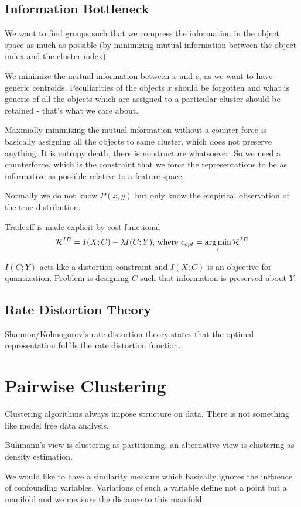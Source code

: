 \documentclass[12pt]{article}
\begin{document}
\subsection{Information Bottleneck}
\par We want to find groups such that we compress the information in the object space as much as possible (by minimizing mutual information between the object index and the cluster index).
\par We minimize the mutual information between $x$ and $c$, as we want to have generic centroids. Peculiarities of the objects $x$ should be forgotten and what is generic of all the objects which are assigned to a particular cluster should be retained - that's what we care about.
\par Maximally minimizing the mutual information without a counter-force is basically assigning all the objects to same cluster, which does not preserve anything. It is entropy death, there is no structure whatsoever. So we need a counterforce, which is the constraint that we force the representations to be as informative as possible relative to a feature space.
\par Normally we do not know $P(x,y)$ but only know the empirical observation of the true distribution.
\par Tradeoff is made explicit by cost functional
\[ \mathcal{R}^{IB} = I(X;C) - \lambda I(C;Y) \text{, where } c_{opt} = \operatorname*{arg\,min}_{c} \mathcal{R}^{IB} \]
\par $I(C;Y)$ acts like a distortion constraint and $I(X;C)$ is an objective for quantization. Problem is designing $C$ such that information is preserved about $Y$.

\subsection{Rate Distortion Theory}
Shannon/Kolmogorov's rate distortion theory states that the optimal representation fulfils the rate distortion function.

\section{Pairwise Clustering}
\par Clustering algorithms always impose structure on data. There is not something like model free data analysis.
\par Buhmann's view is clustering as partitioning, an alternative view is clustering as density estimation.
\par We would like to have a similarity measure which basically ignores the influence of confounding variables. Variations of such a variable define not a point but a manifold and we measure the distance to this manifold.
\end{document}
